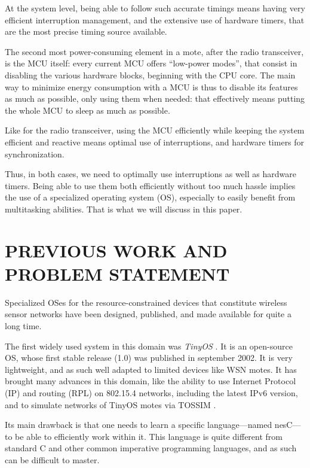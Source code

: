 \documentclass[a4paper,twoside]{article}
\begin{document}
At the system level, being able to follow such accurate timings means having
very efficient interruption management, and the extensive use of hardware
timers, that are the most precise timing source available.

The second most power-consuming element in a mote, after the radio
transceiver, is the MCU itself: every current MCU offers ``low-power modes'',
that consist in disabling the various hardware blocks, beginning with the CPU
core. The main way to minimize energy consumption with a MCU is thus
to disable its features as much as possible, only using them when needed:
that effectively means putting the whole MCU to sleep as much as possible.

Like for the radio transceiver, using the MCU efficiently while keeping
the system efficient and reactive means optimal use of interruptions,
and hardware timers for synchronization.

Thus, in both cases, we need to optimally use interruptions as well as hardware
timers. Being able to use them both efficiently without too much hassle
implies the use of a specialized operating system (OS), especially
to easily benefit from multitasking abilities. That is what we will
discuss in this paper.


\section{\uppercase{Previous work and problem statement}}

Specialized OSes for the resource-constrained devices that constitute
wireless sensor networks have been designed, published, and made available
for quite a long time.


The first widely used system in this domain was \emph{TinyOS} \cite{TinyOS}.
It is an open-source OS, whose first stable release (1.0) was published in
september 2002. It is very lightweight, and as such well adapted to limited
devices like WSN motes.  It has brought many advances in this domain, like
the ability to use Internet Protocol (IP) and routing (RPL) on 802.15.4
networks, including the latest IPv6 version, and to simulate networks
of TinyOS motes via TOSSIM \cite{TOSSIM}.

Its main drawback is that one needs to learn a specific language---named
nesC---to be able to efficiently work within it. This language is quite
different from standard C and other common imperative programming languages,
and as such can be difficult to master.
\end{document}

